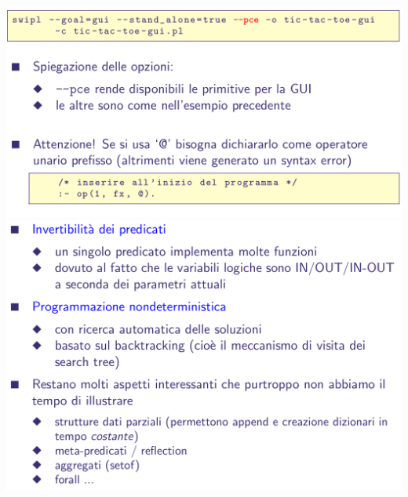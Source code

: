 \documentclass[10pt]{article}
\begin{document}
\\
\includegraphics[scale=0.25]{Immagini/pl56.png}
\\
\includegraphics[scale=0.25]{Immagini/pl57.png}
\end{document}
